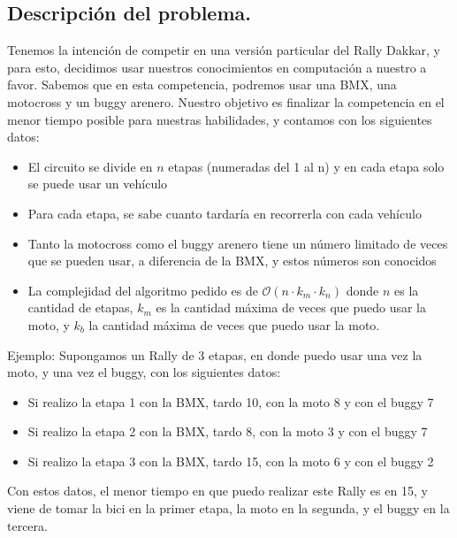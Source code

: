 \subsection{Descripción del problema.}

\vspace*{0.3cm}

Tenemos la intención de competir en una versión particular del Rally Dakkar, y para esto, decidimos usar nuestros conocimientos en computación a nuestro a favor. Sabemos que en esta competencia, podremos usar una BMX, una motocross y un buggy arenero. Nuestro objetivo es finalizar la competencia en el menor tiempo posible para nuestras habilidades, y contamos con los siguientes datos:

\begin{itemize}

	\item El circuito se divide en $n$ etapas (numeradas del 1 al n) y en cada etapa solo se puede usar un vehículo
	\item Para cada etapa, se sabe cuanto tardaría en recorrerla con cada vehículo
	\item Tanto la motocross como el buggy arenero tiene un número limitado de veces que se pueden usar, a diferencia de la BMX, y estos números son conocidos
	\item La complejidad del algoritmo pedido es de $\mathcal{O}(n \cdot k_{m} \cdot k_{n})$ donde $n$ es la cantidad de etapas, $k_{m}$ es la cantidad máxima de veces que puedo usar la moto, y $k_{b}$ la cantidad máxima de veces que puedo usar la moto.
\end{itemize}

Ejemplo:
Supongamos un Rally de 3 etapas, en donde puedo usar una vez la moto, y una vez el buggy, con los siguientes datos:
\begin{itemize}
	\item Si realizo la etapa 1 con la BMX, tardo 10, con la moto 8 y con el buggy 7
	\item Si realizo la etapa 2 con la BMX, tardo 8, con la moto 3 y con el buggy 7
	\item Si realizo la etapa 3 con la BMX, tardo 15, con la moto 6 y con el buggy 2

\end{itemize}

Con estos datos, el menor tiempo en que puedo realizar este Rally es en 15, y viene de tomar la bici en la primer etapa, la moto en la segunda, y el buggy en la tercera.

